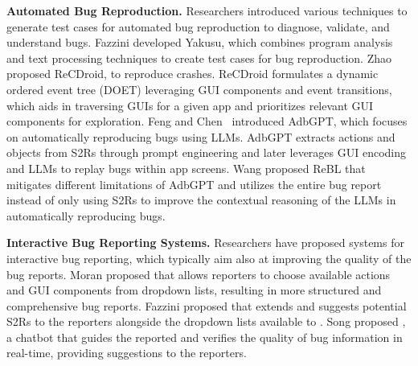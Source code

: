 \textbf{Automated Bug Reproduction.} 
Researchers introduced various techniques to generate test cases for automated bug reproduction to diagnose, validate, and understand bugs. Fazzini  \etal \cite{Fazzini2018} developed Yakusu, which combines program analysis and text processing techniques to create test cases for bug reproduction.  
Zhao  \etal \cite{Zhao2019} proposed ReCDroid, to reproduce crashes. ReCDroid formulates a dynamic ordered event tree (DOET) leveraging GUI components and event transitions, which aids in traversing GUIs for a given app and prioritizes relevant GUI components for exploration. 
Feng and Chen~\cite{Feng2024} introduced AdbGPT, which focuses on automatically reproducing bugs using LLMs. AdbGPT extracts actions and objects from S2Rs through prompt engineering and later leverages GUI encoding and LLMs to replay bugs within app screens. Wang  \etal \cite{Wang2024} proposed ReBL that mitigates different limitations of AdbGPT and utilizes the entire bug report instead of only using S2Rs to improve the contextual reasoning of the LLMs in automatically reproducing bugs.

\textbf{Interactive Bug Reporting Systems.}
Researchers have proposed systems for interactive bug reporting, which typically aim also at improving the quality of the bug reports.
 Moran  \etal proposed \Fusion \cite{Moran2015} that allows reporters to choose available actions and GUI components from dropdown lists, resulting in more structured and comprehensive bug reports. 
 Fazzini  \etal proposed \ebug \cite{Fazzini:TSE22} that extends \Fusion and suggests potential S2Rs to the reporters alongside the dropdown lists available to \Fusion.
 Song  \etal proposed \burt \cite{song2022toward, song2022burt}, a chatbot that guides the reported and verifies the quality of bug information in real-time, providing suggestions to the reporters.